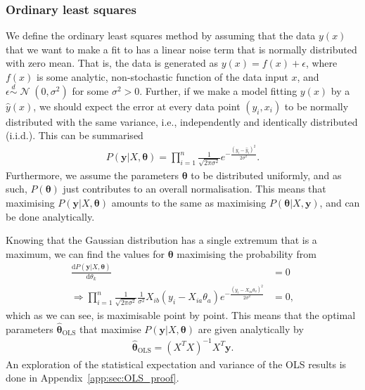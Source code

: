 \documentclass[twocolumn,english,notitlepage]{article}
\renewcommand{\d}[2][x]{\ensuremath{\frac{\mathrm{d}#2}{\mathrm{d}#1}}}
\renewcommand{\vec}[1]{\boldsymbol{#1}}
\newcommand{\pclosed}[1]{\left(#1\right)}
\renewcommand{\exp}[1]{e^{#1}}
\newcommand{\normal}[2]{\operatorname{\mathcal{N}}\pclosed{#1,#2}}
\newcommand{\distas}{\overset{d}{\sim}}
\newcommand{\msub}[2]{\ensuremath{{#1}_\text{#2}}}
\begin{document}
        \subsubsection{Ordinary least squares}
            We define the ordinary least squares method by assuming that the data $y(x)$ that we want to make a fit to has a linear noise term that is normally distributed with zero mean. That is, the data is generated as $y(x) = f(x) + \epsilon$, where $f(x)$ is some analytic, non-stochastic function of the data input $x$, and $\epsilon \distas \normal{0}{\sigma^2}$ for some $\sigma^2>0$. Further, if we make a model fitting $y(x)$ by a $\hat{y}(x)$, we should expect the error at every data point $(y_i, x_i)$ to be normally distributed with the same variance, i.e., independently and identically distributed (i.i.d.). This can be summarised
            \begin{align}
                P(\vec{y}|X, \vec{\theta}) = \prod_{i=1}^{n} \frac{1}{\sqrt{2\pi\sigma^2}} \exp{-\frac{{(y_i-\hat{y}_i)}^2}{2\sigma^2}}.
            \end{align}
            Furthermore, we assume the parameters $\vec{\theta}$ to be distributed uniformly, and as such, $P(\vec{\theta})$ just contributes to an overall normalisation. This means that maximising $P(\vec{y}|X, \vec{\theta})$ amounts to the same as maximising $P(\vec{\theta}|X, \vec{y})$, and can be done analytically.

            Knowing that the Gaussian distribution has a single extremum that is a maximum, we can find the values for $\vec{\theta}$ maximising the probability from
            \begin{align} \nonumber
                \d[\theta_k]{P(\vec{y}|X,\vec{\theta})} &= 0 \\
                \Rightarrow \prod_{i=1}^{n} \frac{1}{\sqrt{2\pi\sigma^2}} \frac{1}{\sigma^2} X_{ib}(y_i-X_{ia}\theta_a) \exp{-\frac{{(y_i - X_{ia}\theta_a)}^2}{2\sigma^2}} &= 0,
            \end{align}
            which as we can see, is maximisable point by point. This means that the optimal parameters $\msub{\vec{\hat{\theta}}}{OLS}$ that maximise $P(\vec{y}|X, \vec{\theta})$ are given analytically by
            \begin{align}
                \boxed{
                    \msub{\vec{\hat{\theta}}}{OLS} = \pclosed{X^TX}^{-1} X^T \vec{y}.
                    \label{theo:eq:OLS_coefs}
                }
            \end{align}
            An exploration of the statistical expectation and variance of the OLS results is done in Appendix~\ref{app:sec:OLS_proof}.
\end{document}
